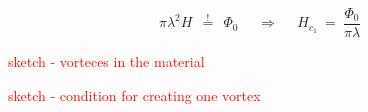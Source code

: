 \documentclass[10pt]{report}
\numberwithin{equation}{chapter}
\begin{document}
\begin{equation}
  \pi \lambda^2 H ~~\overset{!}{=}~~ \Phi_0 ~~~~~~\Rightarrow~~~~~~ H_{c_1} ~=~ \frac{\Phi_0}{\pi \lambda}
\end{equation}




\textcolor{red}{sketch - vorteces in the material}

\textcolor{red}{sketch - condition for creating one vortex}



\end{document}
